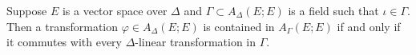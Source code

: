 Suppose $E$ is a vector space over $\Delta$ and $\Gamma \subset A_{\Delta}(E; E)$ is a field such that $\iota \in \Gamma$. Then a transformation $\varphi \in A_{\Delta}(E; E)$ is contained in $A_{\Gamma}(E; E)$ if and only if it commutes with every $\Delta$-linear transformation in $\Gamma$.
